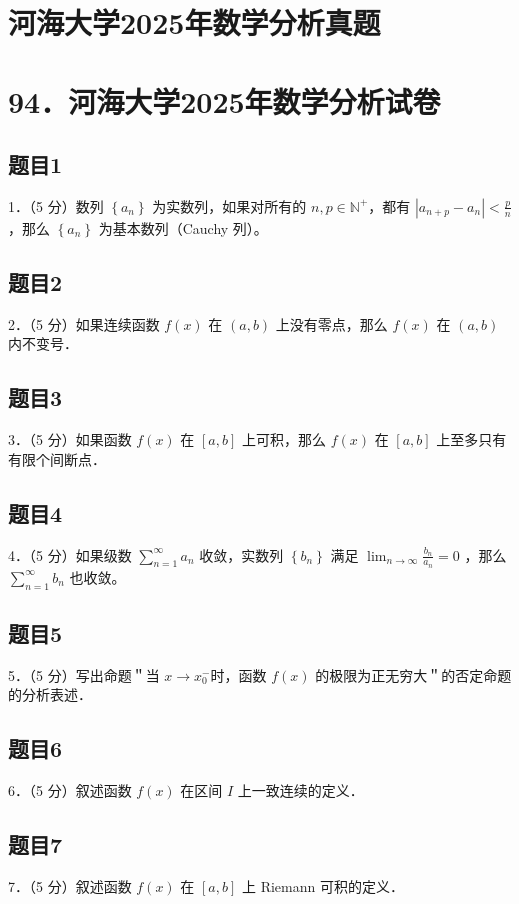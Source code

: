 \documentclass{article}
\begin{document}
\section*{河海大学2025年数学分析真题}
\section*{94．河海大学2025年数学分析试卷}

\subsection{题目1}
1．（5 分）数列 \(\left\{a_{n}\right\}\) 为实数列，如果对所有的 \(n, p \in \mathbb{N}^{+}\)，都有 \(\left|a_{n+p}-a_{n}\right|<\frac{p}{n}\) ，那么 \(\left\{a_{n}\right\}\) 为基本数列（Cauchy 列）。

\subsection{题目2}
2．（5 分）如果连续函数 \(f(x)\) 在 \((a, b)\) 上没有零点，那么 \(f(x)\) 在 \((a, b)\) 内不变号．

\subsection{题目3}
3．（5 分）如果函数 \(f(x)\) 在 \([a, b]\) 上可积，那么 \(f(x)\) 在 \([a, b]\) 上至多只有有限个间断点．

\subsection{题目4}
4．（5 分）如果级数 \(\sum_{n=1}^{\infty} a_{n}\) 收敛，实数列 \(\left\{b_{n}\right\}\) 满足 \(\lim _{n \rightarrow \infty} \frac{b_{n}}{a_{n}}=0\) ，那么 \(\sum_{n=1}^{\infty} b_{n}\) 也收敛。

\subsection{题目5}
5．（5 分）写出命题＂当 \(x \rightarrow x_{0}^{-}\)时，函数 \(f(x)\) 的极限为正无穷大＂的否定命题的分析表述．

\subsection{题目6}
6．（5 分）叙述函数 \(f(x)\) 在区间 \(I\) 上一致连续的定义．

\subsection{题目7}
7．（5 分）叙述函数 \(f(x)\) 在 \([a, b]\) 上 Riemann 可积的定义．
\end{document}
